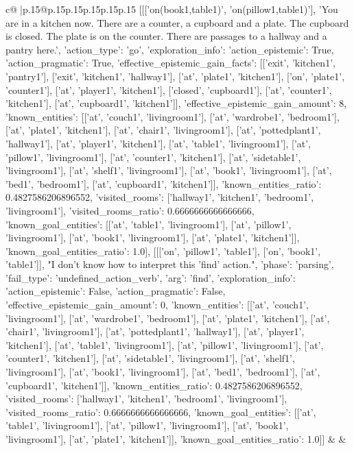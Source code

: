 \documentclass{article}
\begin{document}
{\begin{supertabular}{c@{$\;$}|p{.15\linewidth}@{}p{.15\linewidth}p{.15\linewidth}p{.15\linewidth}p{.15\linewidth}p{.15\linewidth}}
{{{	 [[['on(book1,table1)', 'on(pillow1,table1)'], 'You are in a kitchen now. There are a counter, a cupboard and a plate. The cupboard is closed. The plate is on the counter. There are passages to a hallway and a pantry here.', {'action_type': 'go', 'exploration_info': {'action_epistemic': True, 'action_pragmatic': True, 'effective_epistemic_gain_facts': [['exit', 'kitchen1', 'pantry1'], ['exit', 'kitchen1', 'hallway1'], ['at', 'plate1', 'kitchen1'], ['on', 'plate1', 'counter1'], ['at', 'player1', 'kitchen1'], ['closed', 'cupboard1'], ['at', 'counter1', 'kitchen1'], ['at', 'cupboard1', 'kitchen1']], 'effective_epistemic_gain_amount': 8, 'known_entities': [['at', 'couch1', 'livingroom1'], ['at', 'wardrobe1', 'bedroom1'], ['at', 'plate1', 'kitchen1'], ['at', 'chair1', 'livingroom1'], ['at', 'pottedplant1', 'hallway1'], ['at', 'player1', 'kitchen1'], ['at', 'table1', 'livingroom1'], ['at', 'pillow1', 'livingroom1'], ['at', 'counter1', 'kitchen1'], ['at', 'sidetable1', 'livingroom1'], ['at', 'shelf1', 'livingroom1'], ['at', 'book1', 'livingroom1'], ['at', 'bed1', 'bedroom1'], ['at', 'cupboard1', 'kitchen1']], 'known_entities_ratio': 0.4827586206896552, 'visited_rooms': ['hallway1', 'kitchen1', 'bedroom1', 'livingroom1'], 'visited_rooms_ratio': 0.6666666666666666, 'known_goal_entities': [['at', 'table1', 'livingroom1'], ['at', 'pillow1', 'livingroom1'], ['at', 'book1', 'livingroom1'], ['at', 'plate1', 'kitchen1']], 'known_goal_entities_ratio': 1.0}}], [[['on', 'pillow1', 'table1'], ['on', 'book1', 'table1']], "I don't know how to interpret this 'find' action.", {'phase': 'parsing', 'fail_type': 'undefined_action_verb', 'arg': 'find', 'exploration_info': {'action_epistemic': False, 'action_pragmatic': False, 'effective_epistemic_gain_amount': 0, 'known_entities': [['at', 'couch1', 'livingroom1'], ['at', 'wardrobe1', 'bedroom1'], ['at', 'plate1', 'kitchen1'], ['at', 'chair1', 'livingroom1'], ['at', 'pottedplant1', 'hallway1'], ['at', 'player1', 'kitchen1'], ['at', 'table1', 'livingroom1'], ['at', 'pillow1', 'livingroom1'], ['at', 'counter1', 'kitchen1'], ['at', 'sidetable1', 'livingroom1'], ['at', 'shelf1', 'livingroom1'], ['at', 'book1', 'livingroom1'], ['at', 'bed1', 'bedroom1'], ['at', 'cupboard1', 'kitchen1']], 'known_entities_ratio': 0.4827586206896552, 'visited_rooms': ['hallway1', 'kitchen1', 'bedroom1', 'livingroom1'], 'visited_rooms_ratio': 0.6666666666666666, 'known_goal_entities': [['at', 'table1', 'livingroom1'], ['at', 'pillow1', 'livingroom1'], ['at', 'book1', 'livingroom1'], ['at', 'plate1', 'kitchen1']], 'known_goal_entities_ratio': 1.0}}]] 
	  } 
	   } 
	   } 
	 & & \\ 
 


\end{supertabular}}
\end{document}
